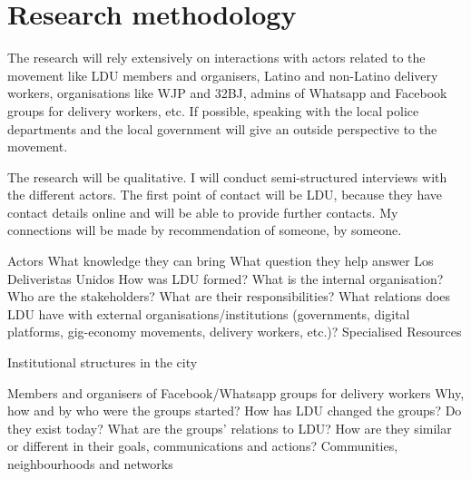 \documentclass{article}
\begin{document}
\section{Research methodology}

\begin{comment}

The research methods appropriate for the proposed research
If you plan to conduct field work or collect empirical data, you should provide details about this (e.g. if you plan interviews, who will you interview? How many interviews will you conduct? Will there be problems of access?). This section should also explain how you are going to analyse your research findings.

Qualitative research: find meanings, opinions, underlying reasons from people; unstructured or semi structured; relatively small sample size; conversational; provides insights, in depth information; focus groups, experiments, interviews,...

\end{comment}

The research will rely extensively on interactions with actors related to the movement like LDU members and organisers, Latino and non-Latino delivery workers, organisations like WJP and 32BJ, admins of Whatsapp and Facebook groups for delivery workers, etc. If possible, speaking with the local police departments and the local government will give an outside perspective to the movement.

The research will be qualitative. I will conduct semi-structured interviews with the different actors. The first point of contact will be LDU, because they have contact details online and will be able to provide further contacts. My connections will be made by recommendation of someone, by someone.

Actors
What knowledge they can bring
What question they help answer
Los Deliveristas Unidos
How was LDU formed?
What is the internal organisation?
Who are the stakeholders? What are their responsibilities?
What relations does LDU have with external organisations/institutions (governments, digital platforms, gig-economy movements, delivery workers, etc.)?
Specialised Resources

Institutional structures in the city




Members and organisers of Facebook/Whatsapp groups for delivery workers 
Why, how and by who were the groups started?
How has LDU changed the groups? Do they exist today? What are the groups’ relations to LDU? How are they similar or different in their goals, communications and actions?
Communities, neighbourhoods and networks
\end{document}
